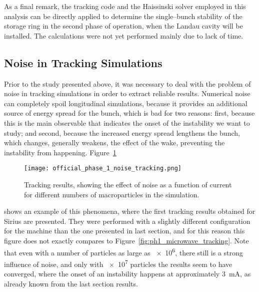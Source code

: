     As a final remark, the tracking code and the Haissinski solver employed in this analysis can be directly applied to determine the single--bunch stability of the storage ring in the second phase of operation, when the Landau cavity will be installed. The calculations were not yet performed mainly due to lack of time.

\subsection{Noise in Tracking Simulations}\label{ssec:noise}

    Prior to the study presented above, it was necessary to deal with the problem of noise in tracking simulations in order to extract reliable results. Numerical noise can completely spoil longitudinal simulations, because it provides an additional source of energy spread for the bunch, which is bad for two reasons: first, because this is the main observable that indicates the onset of the instability we want to study; and second, because the increased energy spread lengthens the bunch, which changes, generally weakens, the effect of the wake, preventing the instability from happening. Figure~\ref{fig:first_tracking}
    \begin{figure}
        \centering
        \texttt{[image: official\_phase\_1\_noise\_tracking.png]}
        \caption{Tracking results, showing the effect of noise as a function of current for different numbers of macroparticles in the simulation.}
        \label{fig:first_tracking}
    \end{figure}
    shows an example of this phenomena, where the first tracking results obtained for Sirius are presented. They were performed with a slightly different configuration for the machine than the one presented in last section, and for this reason this figure does not exactly compares to Figure~\ref{fig:ph1_microwave_tracking}. Note that even with a number of particles as large as \num{e6}, there still is a strong influence of noise, and only with \num{e7} particles the results seem to have converged, where the onset of an instability happens at approximately \SI{3}{\milli\ampere}, as already known from the last section results.

